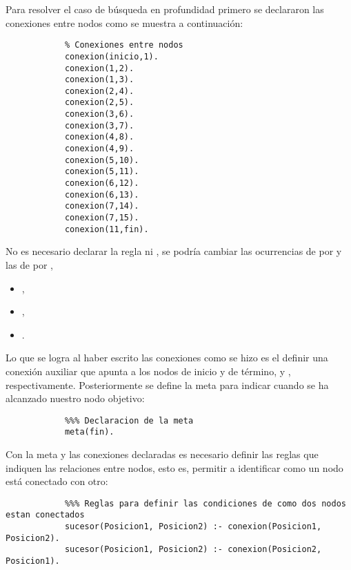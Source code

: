 \begin{solution}
    Para resolver el caso de búsqueda en profundidad primero se declararon las conexiones entre nodos como se muestra a continuación:
        \begin{verbatim}
            % Conexiones entre nodos
            conexion(inicio,1).
            conexion(1,2).
            conexion(1,3).
            conexion(2,4).
            conexion(2,5).
            conexion(3,6).
            conexion(3,7).
            conexion(4,8).
            conexion(4,9).
            conexion(5,10).
            conexion(5,11).
            conexion(6,12).
            conexion(6,13).
            conexion(7,14).
            conexion(7,15).
            conexion(11,fin).
        \end{verbatim}
        No es necesario declarar la regla  ni , se podría cambiar las ocurrencias de  por  y las de  por ,
        \begin{itemize}
            \item {},
            \item {},
            \item {}.
        \end{itemize}
        Lo que se logra al haber escrito las conexiones como se hizo es el definir una conexión auxiliar que apunta a los nodos de inicio y de término,  y , respectivamente. Posteriormente se define la meta para indicar cuando se ha alcanzado nuestro nodo objetivo:
        \begin{verbatim}
            %%% Declaracion de la meta
            meta(fin).
        \end{verbatim}
        
        Con la meta y las conexiones declaradas es necesario definir las reglas que indiquen las relaciones entre nodos, esto es, permitir a  identificar como un nodo está conectado con otro:
        \begin{verbatim}
            %%% Reglas para definir las condiciones de como dos nodos estan conectados
            sucesor(Posicion1, Posicion2) :- conexion(Posicion1, Posicion2).
            sucesor(Posicion1, Posicion2) :- conexion(Posicion2, Posicion1).
        \end{verbatim}


\end{solution}
